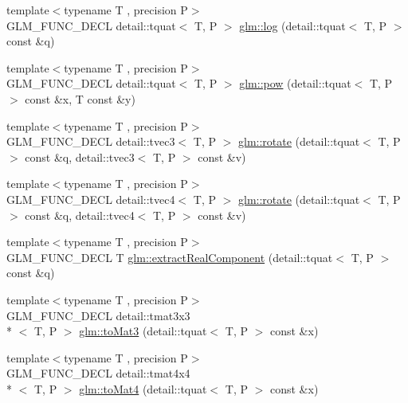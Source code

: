 \begin{DoxyCompactItemize}
\item 
{\footnotesize template$<$typename T , precision P$>$ }\\G\-L\-M\-\_\-\-F\-U\-N\-C\-\_\-\-D\-E\-C\-L detail\-::tquat$<$ T, P $>$ \hyperlink{group__gtx__quaternion_ga832e6b69f9e5f596cad8bada9ebb4477}{glm\-::log} (detail\-::tquat$<$ T, P $>$ const \&q)
\item 
{\footnotesize template$<$typename T , precision P$>$ }\\G\-L\-M\-\_\-\-F\-U\-N\-C\-\_\-\-D\-E\-C\-L detail\-::tquat$<$ T, P $>$ \hyperlink{group__gtx__quaternion_ga9c9854d641f71f853cfed9dc5d4ef762}{glm\-::pow} (detail\-::tquat$<$ T, P $>$ const \&x, T const \&y)
\item 
{\footnotesize template$<$typename T , precision P$>$ }\\G\-L\-M\-\_\-\-F\-U\-N\-C\-\_\-\-D\-E\-C\-L detail\-::tvec3$<$ T, P $>$ \hyperlink{group__gtx__quaternion_gaa4ac5806c1c001ac0247b1e1fd07dddf}{glm\-::rotate} (detail\-::tquat$<$ T, P $>$ const \&q, detail\-::tvec3$<$ T, P $>$ const \&v)
\item 
{\footnotesize template$<$typename T , precision P$>$ }\\G\-L\-M\-\_\-\-F\-U\-N\-C\-\_\-\-D\-E\-C\-L detail\-::tvec4$<$ T, P $>$ \hyperlink{group__gtx__quaternion_ga3461e43b8c7da533b10bc5e9961add80}{glm\-::rotate} (detail\-::tquat$<$ T, P $>$ const \&q, detail\-::tvec4$<$ T, P $>$ const \&v)
\item 
{\footnotesize template$<$typename T , precision P$>$ }\\G\-L\-M\-\_\-\-F\-U\-N\-C\-\_\-\-D\-E\-C\-L T \hyperlink{group__gtx__quaternion_gaad86e595f0021253cb9d34ca32f27f3c}{glm\-::extract\-Real\-Component} (detail\-::tquat$<$ T, P $>$ const \&q)
\item 
{\footnotesize template$<$typename T , precision P$>$ }\\G\-L\-M\-\_\-\-F\-U\-N\-C\-\_\-\-D\-E\-C\-L detail\-::tmat3x3\\*
$<$ T, P $>$ \hyperlink{group__gtx__quaternion_ga9955d74e4bdcfec4039c5285c6e99d8f}{glm\-::to\-Mat3} (detail\-::tquat$<$ T, P $>$ const \&x)
\item 
{\footnotesize template$<$typename T , precision P$>$ }\\G\-L\-M\-\_\-\-F\-U\-N\-C\-\_\-\-D\-E\-C\-L detail\-::tmat4x4\\*
$<$ T, P $>$ \hyperlink{group__gtx__quaternion_ga5d441af6e45262436e73070269d8470c}{glm\-::to\-Mat4} (detail\-::tquat$<$ T, P $>$ const \&x)
\item 

\end{DoxyCompactItemize}
